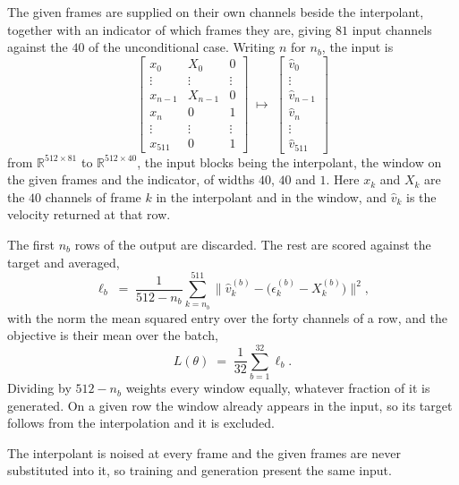 \documentclass[10pt,a4paper]{article}
\begin{document}
The given frames are supplied on their own channels beside the interpolant,
together with an indicator of which frames they are, giving $81$ input channels
against the $40$ of the unconditional case. Writing $n$ for $n_b$, the input is
%
\begin{equation}
\left[
\begin{array}{ccc}
x_0 & X_0 & 0 \\[1pt]
\vdots & \vdots & \vdots \\[1pt]
x_{n-1} & X_{n-1} & 0 \\[1pt]
x_n & 0 & 1 \\[1pt]
\vdots & \vdots & \vdots \\[1pt]
x_{511} & 0 & 1
\end{array}
\right]
\;\longmapsto\;
\left[
\begin{array}{c}
\hat{v}_0 \\[1pt]
\vdots \\[1pt]
\hat{v}_{n-1} \\[1pt]
\hat{v}_n \\[1pt]
\vdots \\[1pt]
\hat{v}_{511}
\end{array}
\right]
\label{eq:condinput}
\end{equation}
%
from $\mathbb{R}^{512\times 81}$ to $\mathbb{R}^{512\times 40}$, the input
blocks being the interpolant, the window on the given frames and the indicator,
of widths $40$, $40$ and $1$. Here $x_k$ and $X_k$ are the $40$ channels of
frame $k$ in the interpolant and in the window, and $\hat{v}_k$ is the velocity
returned at that row.

The first $n_b$ rows of the output are discarded. The rest are scored against
the target and averaged,
%
\begin{equation}
\ell_b \;=\; \frac{1}{512-n_b} \sum_{k=n_b}^{511}
\bigl\| \hat{v}^{(b)}_k - \bigl(\epsilon^{(b)}_k - X^{(b)}_k\bigr) \bigr\|^2 ,
\label{eq:windowloss}
\end{equation}
%
with the norm the mean squared entry over the forty channels of a row, and the
objective is their mean over the batch,
%
\begin{equation}
L(\theta) \;=\; \frac{1}{32}\sum_{b=1}^{32} \ell_b .
\label{eq:condloss}
\end{equation}
%
Dividing by $512-n_b$ weights every window equally, whatever fraction of it is
generated. On a given row the window already appears in the input, so its target
follows from the interpolation and it is excluded.

The interpolant is noised at every frame and the given frames are never
substituted into it, so training and generation present the same input.
\end{document}
